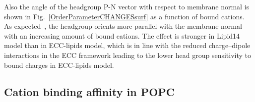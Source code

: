 \documentclass[aip,jcp,twocolumn]{revtex4}
\begin{document}
Also the angle of the headgroup P-N vector with respect to membrane normal
is shown in Fig.~\ref{OrderParameterCHANGESsurf} as a function of bound cations.
As expected~\cite{seelig87}, the headgroup orients more parallel with the membrane
normal with an increasing amount of bound cations. The effect is stronger
in Lipid14 model than in ECC-lipids model, which is in line
with the reduced charge--dipole interactions in the ECC framework  
leading to the lower head group sensitivity to bound charges in ECC-lipids model.



\subsection{Cation binding affinity in POPC}
\end{document}
